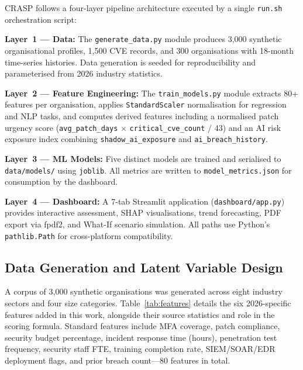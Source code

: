 \documentclass[journal]{IEEEtran}
\begin{document}
CRASP follows a four-layer pipeline architecture executed by a single
\texttt{run.sh} orchestration script:

\textbf{Layer~1 --- Data:} The \texttt{generate\_data.py} module produces
3,000 synthetic organisational profiles, 1,500 CVE records, and 300
organisations with 18-month time-series histories. Data generation is seeded
for reproducibility and parameterised from 2026 industry statistics.

\textbf{Layer~2 --- Feature Engineering:} The \texttt{train\_models.py}
module extracts 80+ features per organisation, applies
\texttt{StandardScaler} normalisation for regression and NLP tasks, and
computes derived features including a normalised patch urgency score
(\texttt{avg\_patch\_days} $\times$ \texttt{critical\_cve\_count} / 43) and
an AI risk exposure index combining \texttt{shadow\_ai\_exposure} and
\texttt{ai\_breach\_history}.

\textbf{Layer~3 --- ML Models:} Five distinct models are trained and
serialised to \texttt{data/models/} using \texttt{joblib}. All metrics are
written to \texttt{model\_metrics.json} for consumption by the dashboard.

\textbf{Layer~4 --- Dashboard:} A 7-tab Streamlit application
(\texttt{dashboard/app.py}) provides interactive assessment, SHAP
visualisations, trend forecasting, PDF export via fpdf2, and What-If
scenario simulation. All paths use Python's \texttt{pathlib.Path} for
cross-platform compatibility.

\subsection{Data Generation and Latent Variable Design}
\label{sec:latent}

A corpus of 3,000 synthetic organisations was generated across eight industry
sectors and four size categories. Table~\ref{tab:features} details the six
2026-specific features added in this work, alongside their source statistics
and role in the scoring formula. Standard features include MFA coverage,
patch compliance, security budget percentage, incident response time (hours),
penetration test frequency, security staff FTE, training completion rate,
SIEM/SOAR/EDR deployment flags, and prior breach count---80 features in total.
\end{document}
